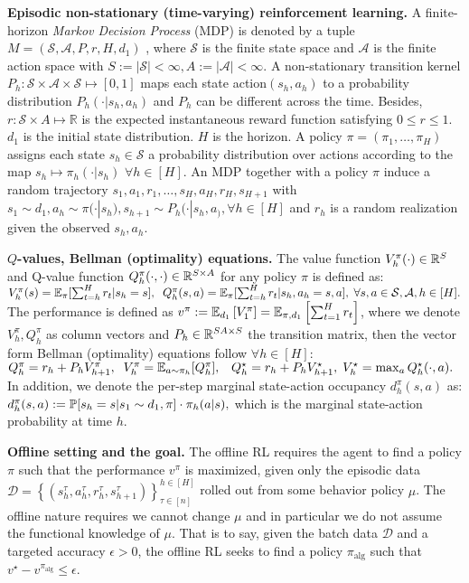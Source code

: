 
\textbf{Episodic non-stationary (time-varying) reinforcement learning.} A finite-horizon \emph{Markov Decision Process} (MDP) is denoted by a tuple $M=(\mathcal{S}, \mathcal{A}, P, r, H, d_1)$ \citep{sutton2018reinforcement}, where $\mathcal{S}$ is the finite state space and $\mathcal{A}$ is the finite action space with $S:=|\mathcal{S}|<\infty,A:=|\mathcal{A}|<\infty$. A non-stationary transition kernel $P_h:\mathcal{S}\times\mathcal{A}\times\mathcal{S} \mapsto [0, 1]$ maps each state action$(s_h,a_h)$ to a probability distribution $P_h(\cdot|s_h,a_h)$ and $P_h$ can be different across the time. Besides, $r : \mathcal{S} \times{A} \mapsto \mathbb{R}$ is the expected instantaneous reward function satisfying $0\leq r\leq1$. $d_1$ is the initial state distribution. $H$ is the horizon. A policy $\pi=(\pi_1,\ldots,\pi_H)$ assigns each state $s_h \in \mathcal{S}$ a probability distribution over actions according to the map $s_h\mapsto \pi_h(\cdot|s_h)$ $\forall h\in[H]$.  An MDP together with a policy $\pi$ induce a random trajectory $ s_1, a_1, r_1, \ldots, s_H,a_H,r_H,s_{H+1}$ with $s_1 \sim d_1, a_h \sim \pi(\cdot|s_h), s_{h+1} \sim P_h (\cdot|s_h, a_), \forall h \in [H]$ and $r_h$ is a random realization given the observed $s_h,a_h$.

\textbf{$Q$-values, Bellman (optimality) equations.} The value function $V^\pi_h(\cdot)\in \R^S$ and Q-value function $Q^\pi_h(\cdot,\cdot)\in \R^{S\times A}$ for any policy $\pi$ is defined as:
$
V^\pi_h(s)=\E_\pi[\sum_{t=h}^H r_{t}|s_h=s] ,\;\;Q^\pi_h(s,a)=\E_\pi[\sum_{t=h}^H  r_{t}|s_h,a_h=s,a],\;\forall s,a\in\mathcal{S},\mathcal{A},h\in[H].
$ The performance is defined as $v^\pi:=\E_{d_1}\left[V^\pi_1\right]=\E_{\pi,d_1}\left[\sum_{t=1}^H  r_t\right]$, where we denote $V_h^\pi,Q_h^\pi$ as column vectors and $P_h\in\R^{SA\times S}$ the transition matrix, then the vector form Bellman (optimality) equations follow $\forall h\in[H]$:
$
Q^\pi_h=r_h+P_hV^\pi_{h+1},\;\;V^\pi_h=\E_{a\sim\pi_h}[Q^\pi_h], \;\;\;Q^\star_h=r_h+P_hV^\star_{h+1},\; V^\star_h=\max_a Q^\star_h(\cdot,a).
$In addition, we denote the per-step marginal state-action occupancy $d^\pi_h(s,a)$ as:
{$
d^\pi_h(s,a):=\P[s_h=s|s_1\sim d_1,\pi]\cdot\pi_h(a|s),
$
}which is the marginal state-action probability at time $h$. 



\textbf{Offline setting and the goal.} The offline RL requires the agent to find a policy $\pi$ such that the performance $v^\pi$ is maximized, given only the episodic data {\small$\mathcal{D}=\left\{\left(s_{h}^{\tau}, a_{h}^{\tau}, r_{h}^{\tau}, s_{h+1}^{\tau}\right)\right\}_{\tau\in[n]}^{h\in[H]}$} rolled out from some behavior policy $\mu$. The offline nature requires we cannot change $\mu$ and in particular we do not assume the functional knowledge of $\mu$. That is to say, given the batch data $\mathcal{D}$ and a targeted accuracy $\epsilon>0$, the offline RL seeks to find a policy $\pi_\text{alg}$ such that $v^\star-v^{\pi_\text{alg}}\leq\epsilon$.

